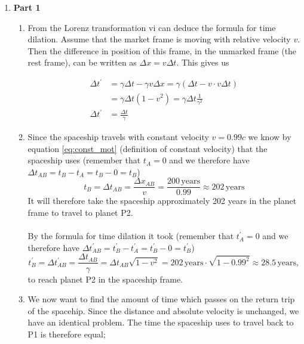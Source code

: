 \documentclass[a4paper,10pt,english]{article}
\begin{document}

\begin{enumerate}

\item \textbf{Part 1}
\begin{enumerate}

\item From the Lorenz transformation vi can deduce the formula for time dilation. Assume that the market frame is moving with relative velocity $v$. Then the difference in position of this frame, in the unmarked frame (the rest frame), can be written as $\Delta x=v\Delta t$. This gives us

\begin{align*}
\Delta t^{\prime}&=\gamma \Delta t-\gamma v\Delta x=\gamma\left(\Delta t-v\cdot v\Delta t\right)\\
&=\gamma\Delta t\left(1-v^{2}\right)=\gamma\Delta t\frac{1}{\gamma^{2}}\\
\Delta t^{\prime}&=\frac{\Delta t}{\gamma}
\end{align*}

\item Since the spaceship travels with constant velocity $v=0.99c$ we know by equation \ref{eq:const_mot} (definition of constant velocity) that the spaceship uses (remember that $t_{A}=0$ and we therefore have $\Delta t_{AB}=t_{B}-t_{A}=t_{B}-0=t_{B}$) \[t_{B}=\Delta t_{AB}=\frac{\Delta x_{AB}}{v}=\frac{200\,\text{years}}{0.99}\approx202\,\text{years}\] It will therefore take the spaceship approximately 202 years in the planet frame to travel to planet P2.
\\
\\ 
By the formula for time dilation it took (remember that $t^{\prime}_{A}=0$ and we therefore have $\Delta t^{\prime}_{AB}=t^{\prime}_{B}-t^{\prime}_{A}=t^{\prime}_{B}-0=t^{\prime}_{B}$) \[t^{\prime}_{B}=\Delta t^{\prime}_{AB}=\dfrac{\Delta t_{AB}}{\gamma}=\Delta t_{AB}\sqrt{1-v^2}=202\,\text{years}\cdot\sqrt{1-0.99^2}\approx28.5\,\text{years},\] to reach planet P2 in the spaceship frame.

\item We now want to find the amount of time which passes on the return trip of the spacehip. Since the distance and absolute velocity is unchanged, we have an identical problem. The time the spaceship uses to travel back to P1 is therefore equal; 


\end{enumerate}
\end{enumerate}
\end{document}
